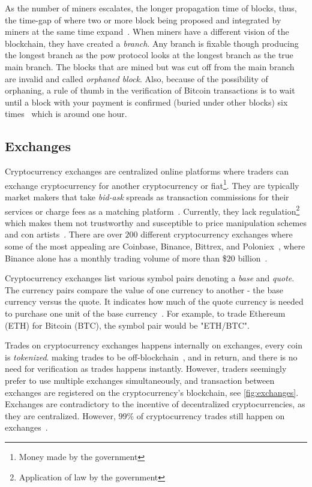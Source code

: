 As the number of miners escalates, the longer propagation time of blocks, thus, the time-gap of where two or more block being proposed and integrated by miners at the same time expand~\cite{trans_fee}. When miners have a different vision of the blockchain, they have created a \emph{branch}. Any branch is fixable though producing the longest branch as the \ac{pow} protocol looks at the longest branch as the true main branch. The blocks that are mined but was cut off from the main branch are invalid and called \emph{orphaned block}. Also, because of the possibility of orphaning, a rule of thumb in the verification of Bitcoin transactions is to wait until a block with your payment is confirmed (buried under other blocks) six times~\cite{bitcoin_verification_1, bitcoin_verification_2} which is around one hour.

\subsection{Exchanges}\label{sec:exchanges}
Cryptocurrency exchanges are centralized online platforms where traders can exchange cryptocurrency for another cryptocurrency or fiat\footnote{Money made by the government\cite{fiat}}. They are typically market makers that take \emph{bid-ask} spreads as transaction commissions for their services or charge fees as a matching platform~\cite{norton_rose}. Currently, they lack regulation\footnote{Application of law by the government} which makes them not trustworthy and susceptible to price manipulation schemes and con artists~\cite{exchange_scammers, exchange_scammers_2}. There are over $200$ different cryptocurrency exchanges where some of the most appealing are Coinbase, Binance, Bittrex, and Poloniex~\cite{exchange_best_1, exchange_best_2}, where Binance alone has a monthly trading volume of more than \$$20$ billion~\cite{coinmarketcap_exchange}.

Cryptocurrency exchanges list various symbol pairs denoting a \emph{base} and \emph{quote}. The currency pairs compare the value of one currency to another - the base currency versus the quote. It indicates how much of the quote currency is needed to purchase one unit of the base currency~\cite{investopedia_cryptocurrency}. For example, to trade Ethereum (ETH) for Bitcoin (BTC), the symbol pair would be "ETH/BTC".

Trades on cryptocurrency exchanges happens internally on exchanges, every coin is \emph{tokenized}. making trades to be off-blockchain~\cite{exchange_off_chain}, and in return, and there is no need for verification as trades happens instantly. However, traders seemingly prefer to use multiple exchanges simultaneously, and transaction between exchanges are registered on the cryptocurrency's blockchain, see \autoref{fig:exchanges}. Exchanges are contradictory to the incentive of decentralized cryptocurrencies, as they are centralized. However, $99\%$ of cryptocurrency trades still happen on exchanges~\cite{coinsutra}.

